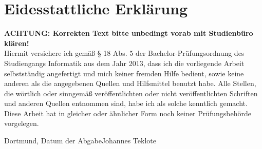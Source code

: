 \documentclass[
	oneside,  %
	ngerman, 
	final, 
	11pt, 
	a4paper, 
	1.1headlines, 
	headinclude=false, 
	footinclude=false, 
	mpinclude=false, 
	pagesize, 
	onecolumn, 
	titlepage, 
	parskip=half, 
	headsepline, 
	chapterprefix=false, 
	version=first, 
	listof=totoc, 
	bibliography=totoc, 
	toc=graduated, 
	fleqn
]{scrbook}
\newcommand*{\fhdopaperdate}{Datum der Abgabe}
\newcommand*{\fhdopaperauthor}{Johannes Teklote}
\begin{document}
\newpage{}

\cleardoublepage{}
\listoftables

\lstlistoflistings 
	


	
\chapter*{Eidesstattliche Erklärung}
\thispagestyle{empty}
\textbf{ACHTUNG: Korrekten Text bitte unbedingt vorab mit Studienbüro klären!}\\
Hiermit versichere ich gemäß § 18 Abs. 5 der Bachelor-Prüfungsordnung des Studiengangs Informatik aus dem Jahr 2013, dass ich die  vorliegende Arbeit selbstständig angefertigt und mich keiner fremden Hilfe bedient, sowie keine anderen als die angegebenen Quellen und Hilfsmittel benutzt habe. Alle Stellen, die wörtlich oder sinngemäß veröffentlichten oder nicht veröffentlichten Schriften und anderen Quellen entnommen sind, habe ich als solche kenntlich gemacht. Diese Arbeit hat in gleicher oder ähnlicher Form noch keiner Prüfungsbehörde vorgelegen.

\vspace{1\baselineskip}%
Dortmund, \fhdopaperdate \hfill \fhdopaperauthor
\end{document}
